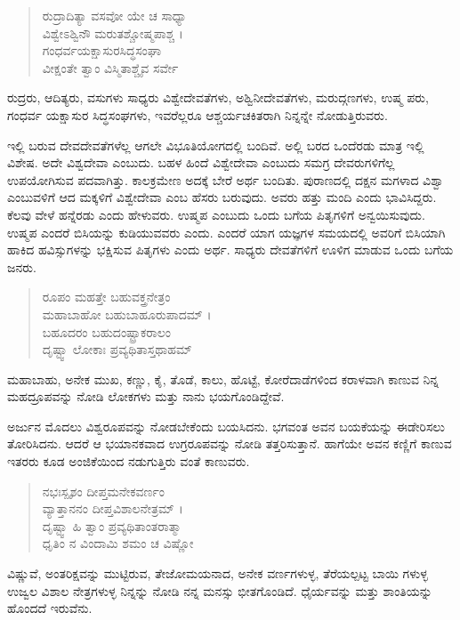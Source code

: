 \begin{verse}
ರುದ್ರಾದಿತ್ಯಾ ವಸವೋ ಯೇ ಚ ಸಾಧ್ಯಾ \\ ವಿಶ್ವೇಽಶ್ವಿನೌ ಮರುತಶ್ಚೋಷ್ಮಪಾಶ್ಚ ।\\ಗಂಧರ್ವಯಕ್ಷಾಸುರಸಿದ್ಧಸಂಘಾ \\ ವೀಕ್ಷಂತೇ ತ್ವಾಂ ವಿಸ್ಮಿತಾಶ್ಚೈವ ಸರ್ವೇ 
\end{verse}

{\small ರುದ್ರರು, ಆದಿತ್ಯರು, ವಸುಗಳು ಸಾಧ್ಯರು ವಿಶ್ವೇದೇವತೆಗಳು, ಅಶ್ವಿನೀದೇವತೆಗಳು, ಮರುದ್ಗಣಗಳು, ಉಷ್ಮ ಪರು, ಗಂಧರ್ವ ಯಕ್ಷಾಸುರ ಸಿದ್ಧಸಂಘಗಳು, ಇವರೆಲ್ಲರೂ ಆಶ್ಚರ್ಯಚಕಿತರಾಗಿ ನಿನ್ನನ್ನೇ ನೋಡುತ್ತಿರುವರು.}

ಇಲ್ಲಿ ಬರುವ ದೇವದೇವತೆಗಳೆಲ್ಲ ಆಗಲೇ ವಿಭೂತಿಯೋಗದಲ್ಲಿ ಬಂದಿವೆ. ಅಲ್ಲಿ ಬರದ ಒಂದೆರಡು ಮಾತ್ರ ಇಲ್ಲಿ ವಿಶೇಷ. ಅದೇ ವಿಶ್ವದೇವಾ ಎಂಬುದು. ಬಹಳ ಹಿಂದೆ ವಿಶ್ವೇದೇವಾ ಎಂಬುದು ಸಮಗ್ರ ದೇವರುಗಳಿಗೆಲ್ಲ ಉಪಯೋಗಿಸುವ ಪದವಾಗಿತ್ತು. ಕಾಲಕ್ರಮೇಣ ಅದಕ್ಕೆ ಬೇರೆ ಅರ್ಥ ಬಂದಿತು. ಪುರಾಣದಲ್ಲಿ ದಕ್ಷನ ಮಗಳಾದ ವಿಶ್ವಾ ಎಂಬುವಳಿಗೆ ಆದ ಮಕ್ಕಳಿಗೆ ವಿಶ್ವೇದೇವಾ ಎಂಬ ಹೆಸರು ಬರುವುದು. ಅವರು ಹತ್ತು ಮಂದಿ ಎಂದು ಭಾವಿಸಿದ್ದರು. ಕೆಲವು ವೇಳೆ ಹನ್ನೆರಡು ಎಂದು ಹೇಳುವರು. ಉಷ್ಮಪ ಎಂಬುದು ಒಂದು ಬಗೆಯ ಪಿತೃಗಳಿಗೆ ಅನ್ವಯಿಸುವುದು. ಉಷ್ಮಪ ಎಂದರೆ ಬಿಸಿಯನ್ನು ಕುಡಿಯುವವರು ಎಂದು. ಎಂದರೆ ಯಾಗ ಯಜ್ಞಗಳ ಸಮಯದಲ್ಲಿ ಅವರಿಗೆ ಬಿಸಿಯಾಗಿ ಹಾಕಿದ ಹವಿಸ್ಸುಗಳನ್ನು ಭಕ್ಷಿಸುವ ಪಿತೃಗಳು ಎಂದು ಅರ್ಥ. ಸಾಧ್ಯರು ದೇವತೆಗಳಿಗೆ ಊಳಿಗ ಮಾಡುವ ಒಂದು ಬಗೆಯ ಜನರು.

\begin{verse}
ರೂಪಂ ಮಹತ್ತೇ ಬಹುವಕ್ತ್ರನೇತ್ರಂ \\ ಮಹಾಬಾಹೋ ಬಹುಬಾಹೂರುಪಾದಮ್ ।\\ಬಹೂದರಂ ಬಹುದಂಷ್ಟ್ರಾಕರಾಲಂ \\ ದೃಷ್ಟ್ವಾ ಲೋಕಾಃ ಪ್ರವ್ಯಥಿತಾಸ್ತಥಾಹಮ್ 
\end{verse}

{\small ಮಹಾಬಾಹು, ಅನೇಕ ಮುಖ, ಕಣ್ಣು, ಕೈ, ತೊಡೆ, ಕಾಲು, ಹೊಟ್ಟೆ, ಕೋರೆದಾಡೆಗಳಿಂದ ಕರಾಳವಾಗಿ ಕಾಣುವ ನಿನ್ನ ಮಹದ್ರೂಪವನ್ನು ನೋಡಿ ಲೋಕಗಳು ಮತ್ತು ನಾನು ಭಯಗೊಂಡಿದ್ದೇವೆ.}

ಅರ್ಜುನ ಮೊದಲು ವಿಶ್ವರೂಪವನ್ನು ನೋಡಬೇಕೆಂದು ಬಯಸಿದನು. ಭಗವಂತ ಅವನ ಬಯಕೆಯನ್ನು ಈಡೇರಿಸಲು ತೋರಿಸಿದನು. ಆದರೆ ಆ ಭಯಾನಕವಾದ ಉಗ್ರರೂಪವನ್ನು ನೋಡಿ ತತ್ತರಿಸುತ್ತಾನೆ. ಹಾಗೆಯೇ ಅವನ ಕಣ್ಣಿಗೆ ಕಾಣುವ ಇತರರು ಕೂಡ ಅಂಜಿಕೆಯಿಂದ ನಡುಗುತ್ತಿರು ವಂತೆ ಕಾಣುವರು.

\begin{verse}
ನಭಃಸ್ಪೃಶಂ ದೀಪ್ತಮನೇಕವರ್ಣಂ \\ ವ್ಯಾತ್ತಾನನಂ ದೀಪ್ತವಿಶಾಲನೇತ್ರಮ್ ।\\ದೃಷ್ಟ್ವಾ ಹಿ ತ್ವಾಂ ಪ್ರವ್ಯಥಿತಾಂತರಾತ್ಮಾ \\ ಧೃತಿಂ ನ ವಿಂದಾಮಿ ಶಮಂ ಚ ವಿಷ್ಣೋ 
\end{verse}

{\small ವಿಷ್ಣುವೆ, ಅಂತರಿಕ್ಷವನ್ನು ಮುಟ್ಟಿರುವ, ತೇಜೋಮಯನಾದ, ಅನೇಕ ವರ್ಣಗಳುಳ್ಳ, ತೆರೆಯಲ್ಪಟ್ಟ ಬಾಯಿ ಗಳುಳ್ಳ ಉಜ್ವಲ ವಿಶಾಲ ನೇತ್ರಗಳುಳ್ಳ ನಿನ್ನನ್ನು ನೋಡಿ ನನ್ನ ಮನಸ್ಸು ಭೀತಗೊಂಡಿದೆ. ಧೈರ್ಯವನ್ನು ಮತ್ತು ಶಾಂತಿಯನ್ನು ಹೊಂದದೆ ಇರುವೆನು.}

